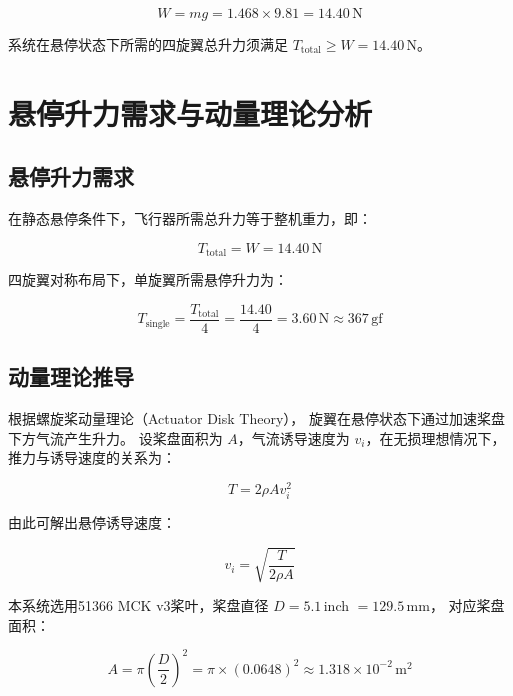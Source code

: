 \begin{equation}
    W = mg = 1.468 \times 9.81 = 14.40\,\text{N}
    \label{eq:weight}
\end{equation}

系统在悬停状态下所需的四旋翼总升力须满足 $T_{\text{total}} \geq W = 14.40$\,N。


\section{悬停升力需求与动量理论分析}

\subsection{悬停升力需求}

在静态悬停条件下，飞行器所需总升力等于整机重力，即：

\begin{equation}
    T_{\text{total}} = W = 14.40\,\text{N}
    \label{eq:hover_thrust}
\end{equation}

四旋翼对称布局下，单旋翼所需悬停升力为：

\begin{equation}
    T_{\text{single}} = \frac{T_{\text{total}}}{4} = \frac{14.40}{4} = 3.60\,\text{N} \approx 367\,\text{gf}
    \label{eq:single_thrust}
\end{equation}

\subsection{动量理论推导}

根据螺旋桨动量理论（Actuator Disk Theory），
旋翼在悬停状态下通过加速桨盘下方气流产生升力。
设桨盘面积为 $A$，气流诱导速度为 $v_i$，在无损理想情况下，推力与诱导速度的关系为：

\begin{equation}
    T = 2\rho A v_i^2
    \label{eq:momentum_theory}
\end{equation}

由此可解出悬停诱导速度：

\begin{equation}
    v_i = \sqrt{\frac{T}{2\rho A}}
    \label{eq:induced_velocity}
\end{equation}

本系统选用51366 MCK v3桨叶，桨盘直径 $D = 5.1$\,inch $= 129.5$\,mm，
对应桨盘面积：

\begin{equation}
    A = \pi \left(\frac{D}{2}\right)^2 = \pi \times (0.0648)^2 \approx 1.318 \times 10^{-2}\,\text{m}^2
    \label{eq:disk_area}
\end{equation}

